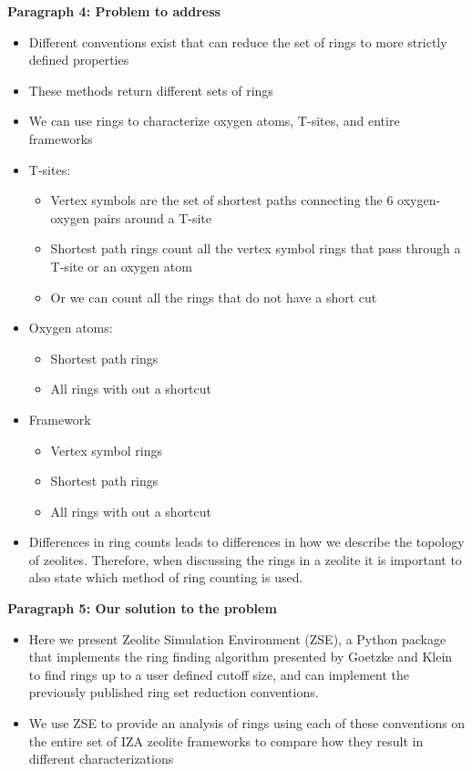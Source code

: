 \documentclass[11pt]{article}
\begin{document}
\textbf{\textbf{Paragraph 4: Problem to address}}
\begin{itemize}
\item Different conventions exist that can reduce the set of rings to more strictly defined properties
\item These methods return different sets of rings
\item We can use rings to characterize oxygen atoms, T-sites, and entire frameworks
\item T-sites:
\begin{itemize}
\item Vertex symbols are the set of shortest paths connecting the 6 oxygen-oxygen pairs around a T-site \cite{okeeffe-vertex-1997}
\item Shortest path rings count all the vertex symbol rings that pass through a T-site or an oxygen atom \cite{sastre-topological-2009}
\item Or we can count all the rings that do not have a short cut \cite{goetzke-properties-1991}
\end{itemize}
\item Oxygen atoms:
\begin{itemize}
\item Shortest path rings
\item All rings with out a shortcut
\end{itemize}
\item Framework
\begin{itemize}
\item Vertex symbol rings
\item Shortest path rings
\item All rings with out a shortcut
\end{itemize}
\item Differences in ring counts leads to differences in how we describe the topology of zeolites. Therefore, when discussing the rings in a zeolite it is important to also state which method of ring counting is used.
\end{itemize}

\textbf{\textbf{Paragraph 5: Our solution to the problem}}
\begin{itemize}
\item Here we present Zeolite Simulation Environment (ZSE), a Python package that implements the ring finding algorithm presented by Goetzke and Klein \cite{goetzke-properties-1991} to find rings up to a user defined cutoff size, and can implement the previously published ring set reduction conventions.
\item We use ZSE to provide an analysis of rings using each of these conventions on the entire set of IZA zeolite frameworks to compare how they result in different characterizations
\end{itemize}
\end{document}
